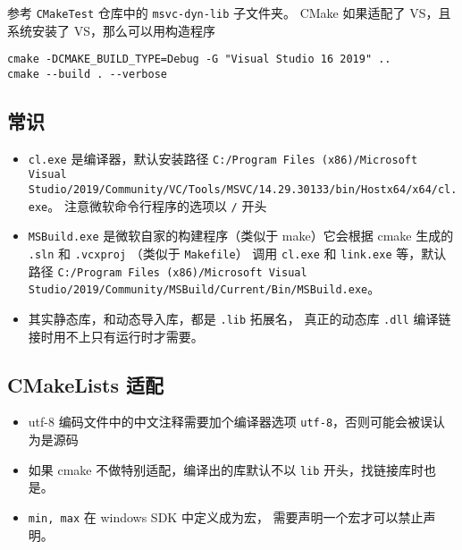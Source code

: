 
参考 \verb`CMakeTest` 仓库中的 \verb`msvc-dyn-lib` 子文件夹。 CMake 如果适配了 VS，且系统安装了 VS，那么可以用构造程序
\begin{lstlisting}[language=none]
cmake -DCMAKE_BUILD_TYPE=Debug -G "Visual Studio 16 2019" ..
cmake --build . --verbose
\end{lstlisting}

\subsection{常识}
\begin{itemize}
\item \verb`cl.exe` 是编译器，默认安装路径 \verb`C:/Program Files (x86)/Microsoft Visual Studio/2019/Community/VC/Tools/MSVC/14.29.30133/bin/Hostx64/x64/cl.exe`。 注意微软命令行程序的选项以 \verb`/` 开头
\item \verb`MSBuild.exe` 是微软自家的构建程序（类似于 make）它会根据 cmake 生成的 \verb`.sln` 和 \verb`.vcxproj` （类似于 \verb`Makefile`） 调用 \verb`cl.exe` 和 \verb`link.exe` 等，默认路径 \verb`C:/Program Files (x86)/Microsoft Visual Studio/2019/Community/MSBuild/Current/Bin/MSBuild.exe`。
\item 其实静态库，和动态导入库，都是 \verb`.lib` 拓展名， 真正的动态库 \verb`.dll` 编译链接时用不上只有运行时才需要。
\end{itemize}

\subsection{CMakeLists 适配}
\begin{itemize}
\item utf-8 编码文件中的中文注释需要加个编译器选项 \verb`utf-8`，否则可能会被误认为是源码
\item 如果 cmake 不做特别适配，编译出的库默认不以 \verb`lib` 开头，找链接库时也是。
\item \verb`min, max` 在 windows SDK 中定义成为宏， 需要声明一个宏才可以禁止声明。
\end{itemize}
